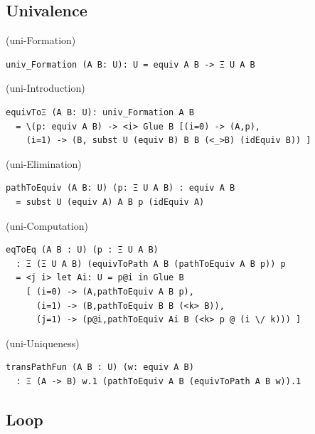 \documentclass{article}
\begin{document}
\newpage
\subsection{Univalence}

\begin{definition} (uni-Formation)
\begin{lstlisting}
univ_Formation (A B: U): U = equiv A B -> Ξ U A B
\end{lstlisting}
\end{definition}

\begin{definition} (uni-Introduction)
\begin{lstlisting}
equivToΞ (A B: U): univ_Formation A B
  = \(p: equiv A B) -> <i> Glue B [(i=0) -> (A,p),
    (i=1) -> (B, subst U (equiv B) B B (<_>B) (idEquiv B)) ]
\end{lstlisting}
\end{definition}

\begin{definition} (uni-Elimination)
\begin{lstlisting}
pathToEquiv (A B: U) (p: Ξ U A B) : equiv A B
  = subst U (equiv A) A B p (idEquiv A)
\end{lstlisting}
\end{definition}

\begin{definition} (uni-Computation)
\begin{lstlisting}
eqToEq (A B : U) (p : Ξ U A B)
  : Ξ (Ξ U A B) (equivToPath A B (pathToEquiv A B p)) p
  = <j i> let Ai: U = p@i in Glue B
    [ (i=0) -> (A,pathToEquiv A B p),
      (i=1) -> (B,pathToEquiv B B (<k> B)),
      (j=1) -> (p@i,pathToEquiv Ai B (<k> p @ (i \/ k))) ]

\end{lstlisting}
\end{definition}

\begin{definition} (uni-Uniqueness)
\begin{lstlisting}
transPathFun (A B : U) (w: equiv A B)
  : Ξ (A -> B) w.1 (pathToEquiv A B (equivToPath A B w)).1
\end{lstlisting}
\end{definition}

\newpage
\subsection{Loop}
\end{document}
